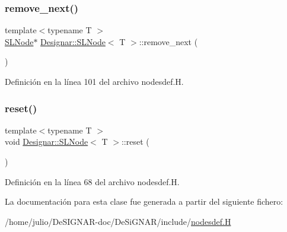\mbox{\label{class_designar_1_1_s_l_node_aa12ebd41228f87e9df06d5e74b7111e6}} 
\subsubsection{\texorpdfstring{remove\+\_\+next()}{remove\_next()}}
{\footnotesize\ttfamily template$<$typename T $>$ \\
\hyperlink{class_designar_1_1_s_l_node}{S\+L\+Node}$\ast$ \hyperlink{class_designar_1_1_s_l_node}{Designar\+::\+S\+L\+Node}$<$ T $>$\+::remove\+\_\+next (\begin{DoxyParamCaption}{ }\end{DoxyParamCaption})\hspace{0.3cm}{\ttfamily [inline]}}



Definición en la línea 101 del archivo nodesdef.\+H.

\mbox{\label{class_designar_1_1_s_l_node_ad837fcbb2d5d1fb1c7aa51392f6fdaae}} 
\subsubsection{\texorpdfstring{reset()}{reset()}}
{\footnotesize\ttfamily template$<$typename T $>$ \\
void \hyperlink{class_designar_1_1_s_l_node}{Designar\+::\+S\+L\+Node}$<$ T $>$\+::reset (\begin{DoxyParamCaption}{ }\end{DoxyParamCaption})\hspace{0.3cm}{\ttfamily [inline]}}



Definición en la línea 68 del archivo nodesdef.\+H.



La documentación para esta clase fue generada a partir del siguiente fichero\+:\begin{DoxyCompactItemize}
\item 
/home/julio/\+De\+S\+I\+G\+N\+A\+R-\/doc/\+De\+Si\+G\+N\+A\+R/include/\hyperlink{nodesdef_8_h}{nodesdef.\+H}\end{DoxyCompactItemize}
